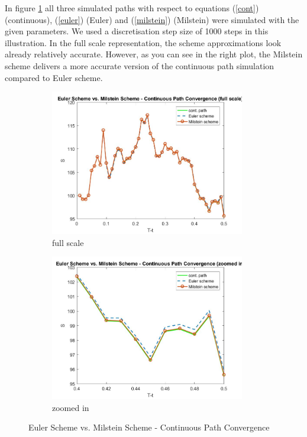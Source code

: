 \documentclass[a4paper,11pt]{article}
\begin{document}
In figure \ref{plot1} all three simulated paths with respect to equations (\ref{cont}) (continuous), (\ref{euler}) (Euler) and (\ref{milstein}) (Milstein) were simulated with the given parameters. We used a discretisation step size of 1000 steps in this illustration. In the full scale representation, the scheme approximations look already relatively accurate. However, as you can see in the right plot, the Milstein scheme delivers a more accurate version of the continuous path simulation compared to Euler scheme. 

\begin{figure}[!h]
\centering
\begin{subfigure}[c]{0.5\textwidth}
\caption*{full scale}
\includegraphics[width=8.5cm]{plot11.jpeg}
\end{subfigure}
\begin{subfigure}[c]{0.4\textwidth}
\caption*{zoomed in}
\includegraphics[width=8.5cm]{plot11z.jpeg}
\end{subfigure}
\caption{Euler Scheme vs. Milstein Scheme - Continuous Path Convergence}
\label{plot1}
\end{figure}
\end{document}
